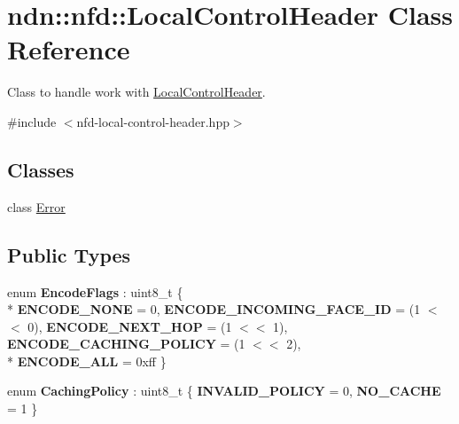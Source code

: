\hypertarget{classndn_1_1nfd_1_1LocalControlHeader}{}\section{ndn\+:\+:nfd\+:\+:Local\+Control\+Header Class Reference}
\label{classndn_1_1nfd_1_1LocalControlHeader}


Class to handle work with \hyperlink{classndn_1_1nfd_1_1LocalControlHeader}{Local\+Control\+Header}.  




{\ttfamily \#include $<$nfd-\/local-\/control-\/header.\+hpp$>$}

\subsection*{Classes}
\begin{DoxyCompactItemize}
\item 
class \hyperlink{classndn_1_1nfd_1_1LocalControlHeader_1_1Error}{Error}
\end{DoxyCompactItemize}
\subsection*{Public Types}
\begin{DoxyCompactItemize}
\item 
enum {\bfseries Encode\+Flags} \+: uint8\+\_\+t \{ \\*
{\bfseries E\+N\+C\+O\+D\+E\+\_\+\+N\+O\+NE} = 0, 
{\bfseries E\+N\+C\+O\+D\+E\+\_\+\+I\+N\+C\+O\+M\+I\+N\+G\+\_\+\+F\+A\+C\+E\+\_\+\+ID} = (1 $<$$<$ 0), 
{\bfseries E\+N\+C\+O\+D\+E\+\_\+\+N\+E\+X\+T\+\_\+\+H\+OP} = (1 $<$$<$ 1), 
{\bfseries E\+N\+C\+O\+D\+E\+\_\+\+C\+A\+C\+H\+I\+N\+G\+\_\+\+P\+O\+L\+I\+CY} = (1 $<$$<$ 2), 
\\*
{\bfseries E\+N\+C\+O\+D\+E\+\_\+\+A\+LL} = 0xff
 \}\hypertarget{classndn_1_1nfd_1_1LocalControlHeader_a681702da1dfdc3451ff08d11f089c25d}{}\label{classndn_1_1nfd_1_1LocalControlHeader_a681702da1dfdc3451ff08d11f089c25d}

\item 
enum {\bfseries Caching\+Policy} \+: uint8\+\_\+t \{ {\bfseries I\+N\+V\+A\+L\+I\+D\+\_\+\+P\+O\+L\+I\+CY} = 0, 
{\bfseries N\+O\+\_\+\+C\+A\+C\+HE} = 1
 \}\hypertarget{classndn_1_1nfd_1_1LocalControlHeader_a6f9fff8664887587bd4d219fd482bfd2}{}\label{classndn_1_1nfd_1_1LocalControlHeader_a6f9fff8664887587bd4d219fd482bfd2}

\end{DoxyCompactItemize}
